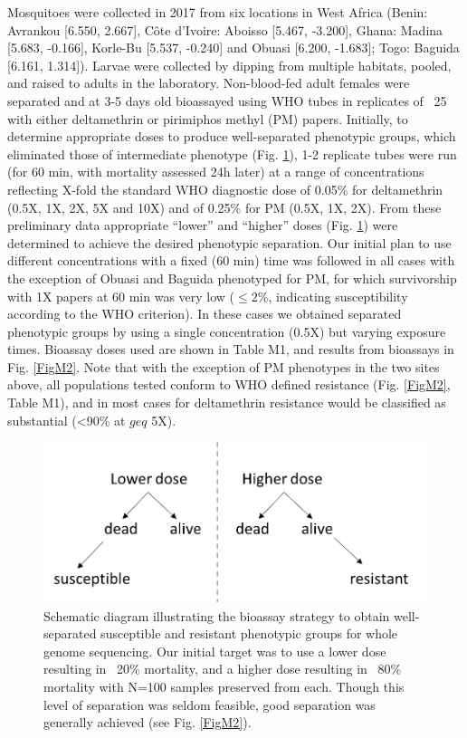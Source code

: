 \documentclass[a4paper,12pt]{article}
\begin{document}
Mosquitoes were collected in 2017 from six locations in West Africa (Benin: Avrankou [6.550, 2.667], Côte d’Ivoire: Aboisso [5.467, -3.200], Ghana: Madina [5.683, -0.166], Korle-Bu [5.537, -0.240] and Obuasi [6.200, -1.683]; Togo: Baguida [6.161, 1.314]). Larvae were collected by dipping from multiple habitats, pooled, and raised to adults in the laboratory. Non-blood-fed adult females were separated and at 3-5 days old bioassayed using WHO tubes in replicates of ~25 with either deltamethrin or pirimiphos methyl (PM) papers. Initially, to determine appropriate doses to produce well-separated phenotypic groups, which eliminated those of intermediate phenotype (Fig. \ref{FigM1}), 1-2 replicate tubes were run (for 60 min, with mortality assessed 24h later) at a range of concentrations reflecting X-fold the standard WHO diagnostic dose of 0.05\% for deltamethrin (0.5X, 1X, 2X, 5X and 10X) and of 0.25\% for PM (0.5X, 1X, 2X). From these preliminary data appropriate ``lower'' and ``higher'' doses (Fig. \ref{FigM1}) were determined to achieve the desired phenotypic separation. Our initial plan to use different concentrations with a fixed (60 min) time was followed in all cases with the exception of Obuasi and Baguida phenotyped for PM, for which survivorship with 1X papers at 60 min was very low ($\leq 2\%$, indicating susceptibility according to the WHO criterion). In these cases we obtained separated phenotypic groups by using a single concentration (0.5X) but varying exposure times. Bioassay doses used are shown in Table M1, and results from bioassays in Fig. \ref{FigM2}. Note that with the exception of PM phenotypes in the two sites above, all populations tested conform to WHO defined resistance (Fig. \ref{FigM2}, Table M1), and in most cases for deltamethrin resistance would be classified as substantial (<90\% at $geq$ 5X).

\begin{figure}[h]
	\begin{center}
		\includegraphics*[width = 5in]{figures/bioassay_design.png}
	\end{center}
	\caption{\footnotesize Schematic diagram illustrating the bioassay strategy to obtain well-separated susceptible and resistant phenotypic groups for whole genome sequencing. Our initial target was to use a lower dose resulting in ~20\% mortality, and a higher dose resulting in ~80\% mortality with N=100 samples preserved from each. Though this level of separation was seldom feasible, good separation was generally achieved (see Fig. \ref{FigM2}).}
	\label{FigM1}
\end{figure}
\end{document}
